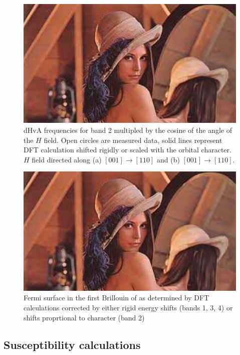 \begin{figure}[h!]
    \begin{center}
        \includegraphics[scale=0.7]{Misc/TODO}
        \caption{dHvA frequencies for band 2 multipled by the cosine of the angle of the $H$ field. Open circles are measured data, solid lines represent DFT calculation shifted rigidly or scaled with the \DzTwo orbital character. $H$ field directed along (a) $[001]\rightarrow[110]$ and (b) $[001]\rightarrow[110]$.}
        \label{Fig:3:FinalRotPlot}
    \end{center}
\end{figure}
\begin{figure}[h!]
    \begin{center}
        \includegraphics[scale=0.7]{Misc/TODO}
        \caption{Fermi surface in the first Brillouin of \BaFeP as determined by DFT calculations corrected by either rigid energy shifts (bands 1, 3, 4) or shifts proprtional to \DzTwo character (band 2)}
        \label{Fig:3:DFTCorrectedUnitCell}
    \end{center}
\end{figure}


\subsection{Susceptibility calculations}
\label{Sec:SubsceptibilityCalculation}
